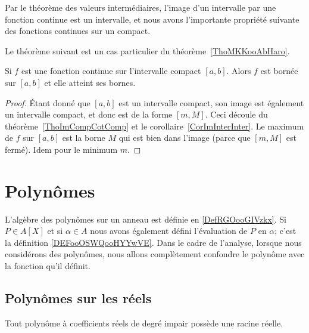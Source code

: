Par le théorème des valeurs intermédiaires, l'image d'un intervalle par une fonction continue est un intervalle, et nous avons l'importante propriété suivante des fonctions continues sur un compact.

Le théorème suivant est un cas particulier du théorème~\ref{ThoMKKooAbHaro}.
\begin{theorem}
    Si $f$ est une fonction continue sur l'intervalle compact $[a,b]$. Alors $f$ est bornée sur $[a,b]$ et elle atteint ses bornes.
\end{theorem}

\begin{proof}
    Étant donné que $[a,b]$ est un intervalle compact, son image est également un intervalle compact, et donc est de la forme $[m,M]$. Ceci découle du théorème~\ref{ThoImCompCotComp} et le corollaire~\ref{CorImInterInter}. Le maximum de $f$ sur $[a,b]$ est la borne $M$ qui est bien dans l'image (parce que $[m,M]$ est fermé). Idem pour le minimum $m$.
\end{proof}

\section{Polynômes}

L'algèbre des polynômes sur un anneau est définie en \ref{DefRGOooGIVzkx}. Si \( P\in A[X]\) et si \( \alpha\in A\) nous avons également défini l'évaluation de \( P\) en \( \alpha\); c'est la définition \ref{DEFooOSWQooHYYwVE}. Dans le cadre de l'analyse, lorsque nous considérons des polynômes, nous allons complètement confondre le polynôme avec la fonction qu'il définit.

\subsection{Polynômes sur les réels}

\begin{proposition}     \label{PROPooJKYJooFqbQMr}
    Tout polynôme à coefficients réels de degré impair possède une racine réelle.
\end{proposition}

